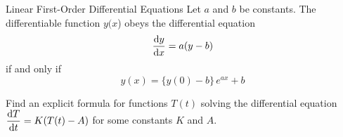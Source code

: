 \begin{frame}[t]
\begin{block}{Linear First-Order Differential Equations}
Let $a$ and $b$ be constants.
The differentiable function $y(x$) obeys the differential equation
\begin{equation*}
\frac{\text{d}y}{\text{d}x} =a(y-b)
\end{equation*}
if and only if
\begin{equation*}
y(x) = \{y(0)-b\}\,e^{ax} + b
\end{equation*}
\end{block}
Find an explicit formula for functions $T(t)$ solving the differential equation $\displaystyle\frac{\text{d}T}{\text{d}t}=K(T(t)-A)$
for some constants $K$ and $A$.

\end{frame}
